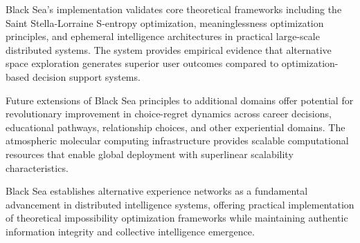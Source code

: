 \documentclass[12pt,a4paper]{article}
\begin{document}
Black Sea's implementation validates core theoretical frameworks including the Saint Stella-Lorraine S-entropy optimization, meaninglessness optimization principles, and ephemeral intelligence architectures in practical large-scale distributed systems. The system provides empirical evidence that alternative space exploration generates superior user outcomes compared to optimization-based decision support systems.

Future extensions of Black Sea principles to additional domains offer potential for revolutionary improvement in choice-regret dynamics across career decisions, educational pathways, relationship choices, and other experiential domains. The atmospheric molecular computing infrastructure provides scalable computational resources that enable global deployment with superlinear scalability characteristics.

Black Sea establishes alternative experience networks as a fundamental advancement in distributed intelligence systems, offering practical implementation of theoretical impossibility optimization frameworks while maintaining authentic information integrity and collective intelligence emergence.



\end{document}
